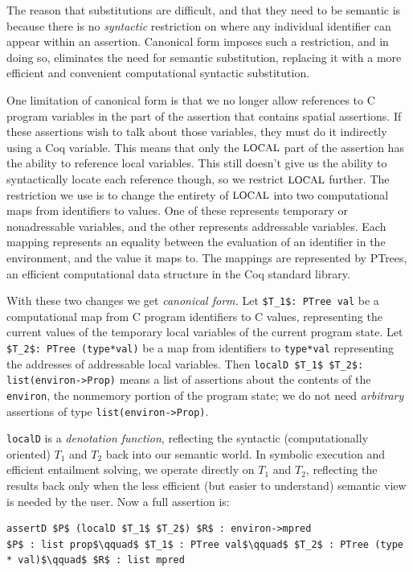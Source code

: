 \documentclass{puthesis}
\begin{document}
The reason that substitutions are difficult, and that they need to be
semantic is because there is no \emph{syntactic} restriction on where
any individual identifier can appear within an assertion.  Canonical
form imposes such a restriction, and in doing so, eliminates the need
for semantic substitution, replacing it with a more efficient and
convenient computational syntactic substitution.

One limitation of canonical form is that we no longer allow references
to C program variables in the part of the assertion that contains
spatial assertions. If these assertions wish to talk about those
variables, they must do it indirectly using a Coq variable.  This
means that only the $\mbox{\small LOCAL}$ part of the assertion has the ability to
reference local variables. This still doesn't give us the ability to
syntactically locate each reference though, so we restrict $\mbox{\small LOCAL}$
further. The restriction we use is to change the entirety of $\mbox{\small LOCAL}$
into two computational maps from identifiers to values.  One of these
represents temporary or nonadressable variables, and the other
represents addressable variables. Each mapping represents an equality
between the evaluation of an identifier in the environment, and the
value it maps to. The mappings are represented by PTrees, an efficient
computational data structure in the Coq standard library.

With these two changes we get \emph{canonical form.}  Let
\lstinline{$T_1$: PTree val} be a computational map from C program
identifiers to C values, representing the current values of the
temporary local variables of the current program state. Let
\lstinline{$T_2$: PTree (type*val)} be a map from identifiers to
\lstinline{type*val} representing the addresses of addressable local
variables.  Then \lstinline{localD $T_1$ $T_2$: list(environ->Prop)}
means a list of assertions about the contents of the
\lstinline{environ}, the nonmemory portion of the program state; we do
not need \emph{arbitrary} assertions of type
\lstinline{list(environ->Prop)}.

\lstinline{localD} is a \emph{denotation function}, reflecting the
syntactic (computationally oriented) $T_1$ and $T_2$ back into our
semantic world.  In symbolic execution and efficient entailment
solving, we operate directly on $T_1$ and $T_2$, reflecting the
results back only when the less efficient (but easier to understand)
semantic view is needed by the user. Now a full assertion is:

\begin{lstlisting}
assertD $P$ (localD $T_1$ $T_2$) $R$ : environ->mpred
$P$ : list prop$\qquad$ $T_1$ : PTree val$\qquad$ $T_2$ : PTree (type * val)$\qquad$ $R$ : list mpred
\end{lstlisting}
\end{document}
